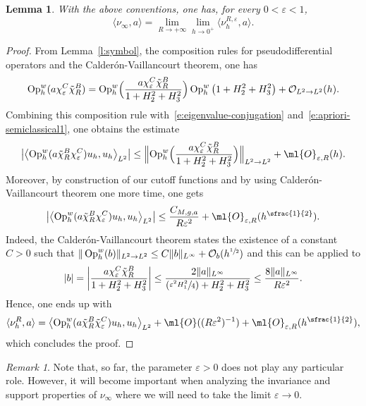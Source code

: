 \documentclass[JEP,XML,SOM,Unicode, NoEqCountersInSection,published]{cedram}
\newcommand{\Psfrac}[2]{(\sfrac{#1}{#2})}
\theoremstyle{plain}
\newtheorem{lemm}[theo]{Lemma}
\theoremstyle{definition}
\theoremstyle{remark}
\newtheorem{rema}[theo]{Remark}
\newcommand{\Op}{\operatorname{Op}}
\begin{document}
\begin{lemm}\label{l:limit-measure} With the above conventions, one has, for every $0<\varepsilon<1$,
\[
\langle \nu_\infty,a\rangle =\lim_{R\to +\infty}\lim_{h\to 0^+}\langle\nu_h^{R,\varepsilon},a\rangle.
\]
\end{lemm}

\begin{proof} From Lemma~\ref{l:symbol}, the composition rules for pseudodifferential operators and the Calderón-Vaillancourt theorem, one has
\[
\Op_h^w(a\chi_\varepsilon^C\tilde{\chi}_R^B)=\Op_h^w\Bigl(\frac{a\chi_\varepsilon^C\tilde{\chi}_R^B}{1+H_2^2+H_3^2}\Bigr)\Op_h^w\left(1+H_2^2+H_3^2\right)+\mathcal{O}_{L^2\to L^2}(h).
\]
Combining this composition rule with~\eqref{e:eigenvalue-conjugation} and~\eqref{e:apriori-semiclassical1}, one obtains the estimate
\begin{equation}%
\left|\left\langle \Op_h^w(a\tilde{\chi}_R^B\chi_\varepsilon^C)u_h,u_h\right\rangle_{L^2}\right|\leq \Bigl\|\Op_h^w\Bigl(\frac{a\chi_\varepsilon^C\tilde{\chi}_R^B}{1+H_2^2+H_3^2}\Bigr)\Bigr\|_{L^2\to L^2}+\ml{O}_{\varepsilon,R}(h).
\end{equation}
Moreover, by construction of our cutoff functions and by using Calderón-Vaillancourt theorem one more time, one gets
\[
\left|\left\langle \Op_h^w(a\tilde{\chi}_R^B\chi_\varepsilon^C)u_h,u_h\right\rangle_{L^2}\right|\leq \frac{C_{M,g,a}}{R\varepsilon^2}+\ml{O}_{\varepsilon,R}(h^{\sfrac{1}{2}}).
\]
Indeed, the Calderón-Vaillancourt theorem states the existence of a constant $C>0$ such that $\|\Op_h^w(b)\|_{L^2\to L^2}\leq C\|b\|_{L^\infty}+\mathcal{O}_b(h^{\sfrac{1}{2}})$ and this can be applied to
\[
|b|=\left|\frac{a\chi_\varepsilon^C\tilde{\chi}_R^B}{1+H_2^2+H_3^2}\right|\leq\frac{2\|a\|_{L^\infty}}{\Psfrac{\varepsilon^2H_1^2}{4}+H_2^2+H_3^2}\leq\frac{8\|a\|_{L^\infty}}{R\varepsilon^2}.
\]
Hence, one ends up with
\begin{equation}%
\langle\nu_h^R,a\rangle=\left\langle \Op_h^w(a\tilde{\chi}_R^B\tilde{\chi}_\varepsilon^C)u_h,u_h\right\rangle_{L^2}+\ml{O}((R\varepsilon^2)^{-1})+\ml{O}_{\varepsilon,R}(h^{\sfrac{1}{2}}),
\end{equation}
which concludes the proof.
\end{proof}

\begin{rema}\label{r:role-epsilon}
Note that, so far, the parameter $\varepsilon>0$ does not play any particular role. However, it will become important when analyzing the invariance and support properties of $\nu_\infty$ where we will need to take the limit $\varepsilon \to 0$.
\end{rema}
\end{document}
